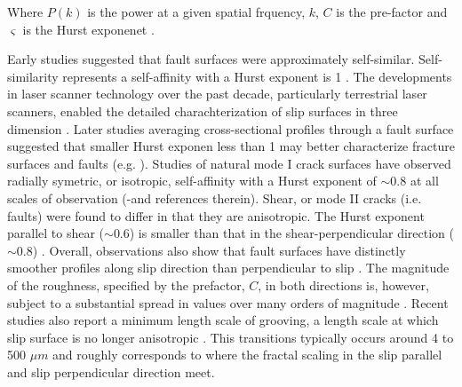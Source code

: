 \documentclass[12pt,a4paper]{article}
\begin{document}
Where $P(k)$ is the power at a given spatial frquency, $k$, $C$ is the pre-factor and $\varsigma$ is the Hurst exponenet \cite{mandelbrot1985self, power1991euclidean, schmittbuhl1993field, candela2012roughness}. 

Early studies suggested that fault surfaces were approximately self-similar. Self-similarity represents a self-affinity with a Hurst exponent is 1 \cite{mandelbrot1985self}. The developments in laser scanner technology over the past decade, particularly terrestrial laser scanners, enabled the detailed charachterization of slip surfaces in three dimension \cite{lee1996structural, kokkalas2007quantitative, renard2006high, sagy2007evolution, sagy2009geometric, jones2009quantitative, bistacchi2011fault, brodsky2011faults, candela2012roughness}. Later studies averaging cross-sectional profiles through a fault surface suggested that smaller Hurst exponen less than 1 may better characterize fracture surfaces and faults (e.g. \cite{schmittbuhl1993field, lee1996structural, sagy2009geometric, candela2012roughness, brodsky2016scale}). Studies of natural mode I crack surfaces have observed radially symetric, or isotropic, self-affinity with a Hurst exponent of $\sim$0.8 at all scales of observation (\cite{schmittbuhl1995scaling, bouchaud1997scaling}-and references therein). Shear, or mode II cracks (i.e. faults) were found to differ in that they are anisotropic. The Hurst exponent parallel to shear ($\sim$0.6) is smaller than that in the shear-perpendicular direction ($\sim$0.8) \cite{lee1996structural, sagy2007evolution, bistacchi2011fault, candela2012roughness}. Overall, observations also show that fault surfaces have distinctly smoother profiles along slip direction than perpendicular to slip \cite{lee1996structural, sagy2007geometric, candela2012roughness}. The magnitude of the roughness, specified by the prefactor, $C$, in both directions is, however, subject to a substantial spread in values over many orders of magnitude \cite{candela2012roughness, brodsky2011faults}. Recent studies also report a minimum length scale of grooving, a length scale at which slip surface is no longer anisotropic \cite{candela2016minimum, brodsky2016constraints}. This transitions typically occurs around 4 to 500 $\mu m$ and roughly corresponds to where the fractal scaling in the slip parallel and slip perpendicular direction meet.
\end{document}
